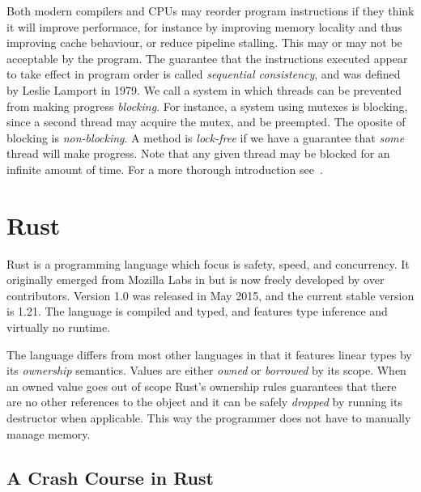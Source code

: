 \documentclass[b5paper,twoside]{report}
\begin{document}
Both modern compilers and CPUs may reorder program instructions if they think
it will improve performace, for instance by improving memory locality and thus
improving cache behaviour, or reduce pipeline stalling. This may or may not be
acceptable by the program. The guarantee that the instructions executed appear
to take effect in program order is called \emph{sequential consistency}, and
was defined by Leslie Lamport in 1979.  We call a system in
which threads can be prevented from making progress \emph{blocking}. For
instance, a system using mutexes is blocking, since a second thread may acquire
the mutex, and be preempted. The oposite of blocking is \emph{non-blocking}.  A
method is \emph{lock-free} if we have a guarantee that \emph{some} thread will
make progress.  Note that any given thread may be blocked for an infinite
amount of time.  For a more thorough introduction see~\cite{herlihy2011art}.




\section{Rust}
 Rust is a programming language which focus is safety, speed, and
concurrency.  It originally emerged from Mozilla Labs in  but is now
freely developed by over  contributors.  Version 1.0 was released
in May 2015, and the current stable version is 1.21.  The language is compiled
and typed, and features type inference and virtually no runtime.

The language differs from most other languages in that it features linear types
by its \emph{ownership} semantics.  Values are either \emph{owned} or
\emph{borrowed} by its scope.  When an owned value goes out of scope Rust's
ownership rules guarantees that there are no other references to the object and
it can be safely \emph{dropped} by running its destructor when applicable.
This way the programmer does not have to manually manage memory.

\subsection{A Crash Course in Rust}
\end{document}
